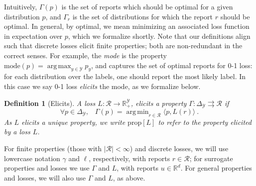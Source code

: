 \documentclass[11pt]{article}
\newcommand{\Comments}{1}
\newcommand{\mytodo}[2]{\ifnum\Comments=1%
  \todo[linecolor=#1!80!black,backgroundcolor=#1,bordercolor=#1!80!black]{#2}\fi}
\newcommand{\raft}[1]{\mytodo{green!20!white}{RF: #1}}
\newcommand{\jessiet}[1]{\mytodo{teal!20!white}{JF: #1}}
\newcommand{\reals}{\mathbb{R}}
\newcommand{\prop}[1]{\mathrm{prop}[#1]}
\newcommand{\mode}{\mathrm{mode}}
\newcommand{\simplex}{\Delta_\Y}
\newcommand{\R}{\mathcal{R}}
\newcommand{\Y}{\mathcal{Y}}
\newcommand{\inprod}[2]{\langle #1, #2 \rangle}%
\newcommand{\toto}{\rightrightarrows}
\DeclareMathOperator*{\argmax}{arg\,max}
\DeclareMathOperator*{\argmin}{arg\,min}
\newtheorem{definition}{Definition}
\begin{document}
Intuitively, $\Gamma(p)$ is the set of reports which should be optimal for a given distribution $p$, and $\Gamma_r$ is the set of distributions for which the report $r$ should be optimal.
In general, by optimal, we mean minimizing an associated loss function in expectation over $p$, which we formalize shortly.
Note that our definitions align such that discrete losses elicit finite properties; both are non-redundant in the correct senses.
For example, the \emph{mode} is the %
property $\mode(p) = \argmax_{y\in\Y} p_y$, and captures the set of optimal reports for 0-1 loss: for each distribution over the labels, one should report the most likely label.
In this case we say 0-1 loss \emph{elicits} the mode, as we formalize below.

\begin{definition}[Elicits]
  \label{def:elicits}
  A loss $L:\R\to\reals^\Y_+$, \emph{elicits} a property $\Gamma:\simplex \toto \R$ if
  \begin{equation}
    \forall p\in\simplex,\;\;\;\Gamma(p) = \argmin_{r \in \R} \inprod{p}{L(r)}~.
  \end{equation}
  As $L$ elicits a unique property, we write $\prop{L}$ to refer to the property elicited by a loss $L$.
\end{definition}

For finite properties (those with $|\R|<\infty$) and discrete losses, we will use lowercase notation $\gamma$ and $\ell$, respectively, with reports $r\in\R$; for surrogate properties and losses we use $\Gamma$ and $L$, with reports $u\in\reals^d$.
For general properties and losses, we will also use $\Gamma$ and $L$, as above.

\end{document}

